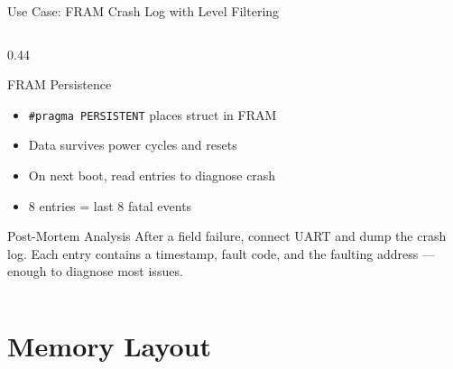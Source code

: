 \documentclass[aspectratio=169, 10pt]{beamer}
\begin{document}
\begin{frame}[fragile]{Use Case: FRAM Crash Log with Level Filtering}
\begin{columns}[T]
\begin{column}{0.44\textwidth}
\begin{center}
\end{center}

\vspace{0.5em}
\begin{block}{FRAM Persistence}
\begin{itemize}
  \item \texttt{\#pragma PERSISTENT} places struct in FRAM
  \item Data survives power cycles and resets
  \item On next boot, read entries to diagnose crash
  \item 8 entries = last 8 fatal events
\end{itemize}
\end{block}

\begin{alertblock}{Post-Mortem Analysis}
After a field failure, connect UART and dump the crash log.
Each entry contains a timestamp, fault code, and the
faulting address --- enough to diagnose most issues.
\end{alertblock}
\end{column}
\end{columns}
\end{frame}

\section{Memory Layout}
\end{document}
